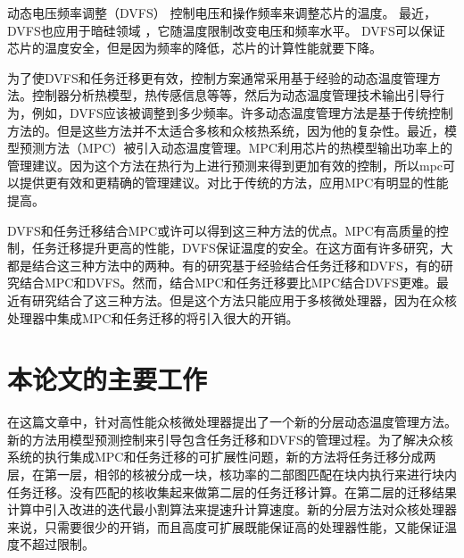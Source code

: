  动态电压频率调整（DVFS）\cite{Skadron:ISCA'03,Jayaseelan:ICCAD'09,Mutapcic:TCASI'09} 控制电压和操作频率来调整芯片的温度。
 最近，DVFS也应用于暗硅领域 \cite{Khdr:dac'15,Muthukaruppan:dac'13}，它随温度限制改变电压和频率水平。
 DVFS可以保证芯片的温度安全，但是因为频率的降低，芯片的计算性能就要下降。
 
 为了使DVFS和任务迁移更有效，控制方案通常采用基于经验的动态温度管理方法。控制器分析热模型，热传感信息等等，然后为动态温度管理技术输出引导行为，例如，DVFS应该被调整到多少频率。许多动态温度管理方法是基于传统控制方法的。但是这些方法并不太适合多核和众核热系统，因为他的复杂性。最近，模型预测方法（MPC）被引入动态温度管理。MPC利用芯片的热模型输出功率上的管理建议。因为这个方法在热行为上进行预测来得到更加有效的控制，所以mpc可以提供更有效和更精确的管理建议。对比于传统的方法，应用MPC有明显的性能提高。
 
 DVFS和任务迁移结合MPC或许可以得到这三种方法的优点。MPC有高质量的控制，任务迁移提升更高的性能，DVFS保证温度的安全。在这方面有许多研究，大都是结合这三种方法中的两种。有的研究基于经验结合任务迁移和DVFS，有的研究结合MPC和DVFS。然而，结合MPC和任务迁移要比MPC结合DVFS更难。最近有研究结合了这三种方法。但是这个方法只能应用于多核微处理器，因为在众核处理器中集成MPC和任务迁移的将引入很大的开销。
 
 \section{本论文的主要工作}\label{sec:thispaper}
在这篇文章中，针对高性能众核微处理器提出了一个新的分层动态温度管理方法。新的方法用模型预测控制来引导包含任务迁移和DVFS的管理过程。为了解决众核系统的执行集成MPC和任务迁移的可扩展性问题，新的方法将任务迁移分成两层，在第一层，相邻的核被分成一块，核功率的二部图匹配在块内执行来进行块内任务迁移。没有匹配的核收集起来做第二层的任务迁移计算。在第二层的迁移结果计算中引入改进的迭代最小割算法来提速升计算速度。新的分层方法对众核处理器来说，只需要很少的开销，而且高度可扩展既能保证高的处理器性能，又能保证温度不超过限制。